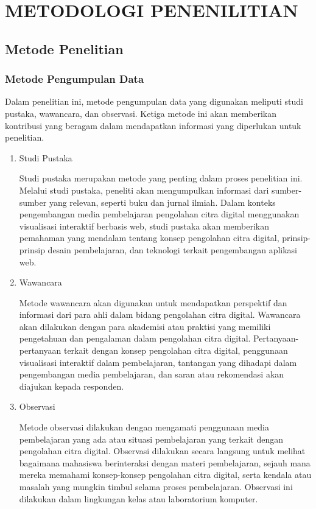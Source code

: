 \chapter{METODOLOGI PENENILITIAN}
\section{Metode Penelitian}
\subsection{Metode Pengumpulan Data}

Dalam penelitian ini, metode pengumpulan data yang digunakan meliputi studi pustaka, wawancara, dan observasi. Ketiga metode ini akan memberikan kontribusi yang beragam dalam mendapatkan informasi yang diperlukan untuk penelitian.

\begin{enumerate}[leftmargin=1cm, itemindent=0.6cm,labelwidth=15pt, labelsep=5pt, listparindent=1cm,align=left]

    \item Studi Pustaka

    Studi pustaka merupakan metode yang penting dalam proses penelitian ini. Melalui studi pustaka, peneliti akan mengumpulkan informasi dari sumber-sumber yang relevan, seperti buku dan jurnal ilmiah. Dalam konteks pengembangan media pembelajaran pengolahan citra digital menggunakan visualisasi interaktif berbasis web, studi pustaka akan memberikan pemahaman yang mendalam tentang konsep pengolahan citra digital, prinsip-prinsip desain pembelajaran, dan teknologi terkait pengembangan aplikasi web.

    \item Wawancara

    Metode wawancara akan digunakan untuk mendapatkan perspektif dan informasi dari para ahli dalam bidang pengolahan citra digital. Wawancara akan dilakukan dengan para akademisi atau praktisi yang memiliki pengetahuan dan pengalaman dalam pengolahan citra digital. Pertanyaan-pertanyaan terkait dengan konsep pengolahan citra digital, penggunaan visualisasi interaktif dalam pembelajaran, tantangan yang dihadapi dalam pengembangan media pembelajaran, dan saran atau rekomendasi akan diajukan kepada responden.

    \item Observasi

    Metode observasi dilakukan dengan mengamati penggunaan media pembelajaran yang ada atau situasi pembelajaran yang terkait dengan pengolahan citra digital. Observasi dilakukan secara langsung untuk melihat bagaimana mahasiswa berinteraksi dengan materi pembelajaran, sejauh mana mereka memahami konsep-konsep pengolahan citra digital, serta kendala atau masalah yang mungkin timbul selama proses pembelajaran. Observasi ini dilakukan dalam lingkungan kelas atau laboratorium komputer.

\end{enumerate}

